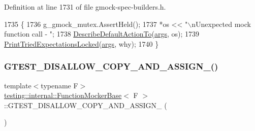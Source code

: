 Definition at line 1731 of file gmock-\/spec-\/builders.\+h.


\begin{DoxyCode}
1735                                                         \{
1736     g\_gmock\_mutex.AssertHeld();
1737     *os << \textcolor{stringliteral}{"\(\backslash\)nUnexpected mock function call - "};
1738     \hyperlink{classtesting_1_1internal_1_1FunctionMockerBase_ac9f58631036d0507047e0088b829c237}{DescribeDefaultActionTo}(\hyperlink{namespacegenerate__debs_a75f9143e38df82d83b2e8a6f99cae02c}{args}, os);
1739     \hyperlink{classtesting_1_1internal_1_1FunctionMockerBase_ad0183c6e8ec34498eb52f4249ec2fe9d}{PrintTriedExpectationsLocked}(\hyperlink{namespacegenerate__debs_a75f9143e38df82d83b2e8a6f99cae02c}{args}, why);
1740   \}
\end{DoxyCode}
\mbox{\label{classtesting_1_1internal_1_1FunctionMockerBase_a5e13e83d93509c4fdf1d0846bc5299c7}} 
\subsubsection{\texorpdfstring{G\+T\+E\+S\+T\+\_\+\+D\+I\+S\+A\+L\+L\+O\+W\+\_\+\+C\+O\+P\+Y\+\_\+\+A\+N\+D\+\_\+\+A\+S\+S\+I\+G\+N\+\_\+()}{GTEST\_DISALLOW\_COPY\_AND\_ASSIGN\_()}}
{\footnotesize\ttfamily template$<$typename F$>$ \\
\hyperlink{classtesting_1_1internal_1_1FunctionMockerBase}{testing\+::internal\+::\+Function\+Mocker\+Base}$<$ F $>$\+::G\+T\+E\+S\+T\+\_\+\+D\+I\+S\+A\+L\+L\+O\+W\+\_\+\+C\+O\+P\+Y\+\_\+\+A\+N\+D\+\_\+\+A\+S\+S\+I\+G\+N\+\_\+ (\begin{DoxyParamCaption}\item[{\hyperlink{classtesting_1_1internal_1_1FunctionMockerBase}{Function\+Mocker\+Base}$<$ F $>$}]{ }\end{DoxyParamCaption})\hspace{0.3cm}{\ttfamily [private]}}

